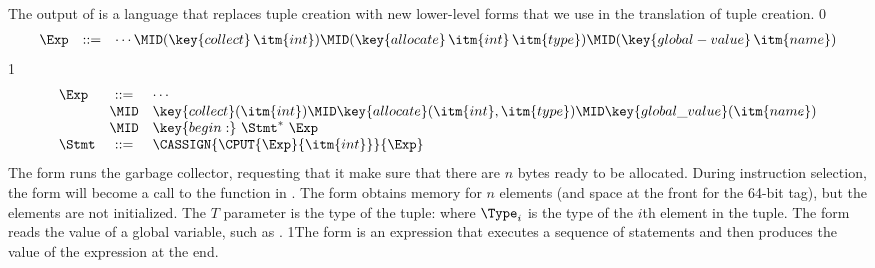 \documentclass[7x10]{TimesAPriori_MIT}%
\def\racketEd{0}
\def\pythonEd{1}
\def\edition{0}
\newcommand{\racket}[1]{{\if\edition\racketEd{#1}\fi}}
\newcommand{\python}[1]{{\if\edition\pythonEd #1\fi}}
\numberwithin{theorem}{chapter}
\numberwithin{definition}{chapter}
\numberwithin{equation}{chapter}
\begin{document}
The output of  is a language \LangAlloc{}
that replaces tuple creation with new lower-level forms that we use in the
translation of tuple creation.
%
{\if\edition\racketEd
\[
\begin{array}{lcl}
  \Exp &::=& \cdots
      \MID (\key{collect} \,\itm{int})
      \MID (\key{allocate} \,\itm{int}\,\itm{type})
      \MID (\key{global-value} \,\itm{name}) 
\end{array}
\]
\fi}
{\if\edition\pythonEd
\[
\begin{array}{lcl}
  \Exp &::=& \cdots\\
      &\MID& \key{collect}(\itm{int})
      \MID \key{allocate}(\itm{int},\itm{type})
      \MID \key{global\_value}(\itm{name}) \\
      &\MID& \key{begin:} ~ \Stmt^{*} ~ \Exp \\
   \Stmt &::= & \CASSIGN{\CPUT{\Exp}{\itm{int}}}{\Exp}
\end{array}
\]
\fi}
%
The  form runs the garbage collector, requesting that it
make sure that there are $n$ bytes ready to be allocated. During
instruction selection, the  form will become a call to
the  function in .
%
The  form obtains memory for $n$ elements (and
space at the front for the 64-bit tag), but the elements are not
initialized.   The $T$ parameter is the type
of the tuple:
%
\VECTY{\racket{$\Type_1 \ldots \Type_n$}\python{$\Type_1, \ldots, \Type_n$}}
%
where $\Type_i$ is the type of the $i$th element in the tuple. The
 form reads the value of a global variable, such
as .
%
\python{The  form is an expression that executes a
  sequence of statements and then produces the value of the expression
  at the end.}
\end{document}
